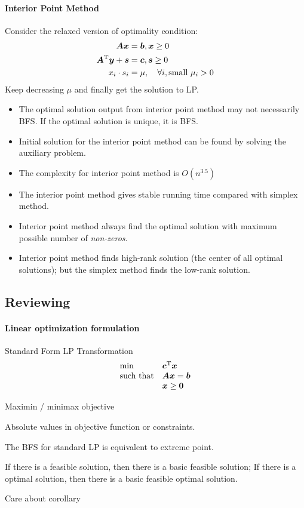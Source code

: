 \paragraph{Interior Point Method}
Consider the relaxed version of optimality condition:
\begin{align*}
\bm{Ax}&=\bm b,\bm x\ge0\\
\bm{A}^{\mathrm T}\bm y+\bm s&=\bm c,\bm s\ge0\\
x_i\cdot s_i&=\mu,\quad\forall i,\mbox{small }\mu_i>0
\end{align*}
Keep decreasing $\mu$ and finally get the solution to LP.
\begin{remark}
\begin{itemize}
\item
The optimal solution output from interior point method may not necessarily BFS. If the optimal solution is unique, it is BFS.
\item
Initial solution for the interior point method can be found by solving the auxiliary problem.
\item
The complexity for interior point method is $O(n^{3.5})$
\item
The interior point method gives stable running time compared with simplex method.
\item
Interior point method always find the optimal solution with maximum possible number of \emph{non-zeros}.
\item
Interior point method finds high-rank solution (the center of all optimal solutions); but the simplex method finds the low-rank solution.
\end{itemize}
\end{remark}

\subsection{Reviewing}
\paragraph{Linear optimization formulation}
Standard Form LP Transformation
\[
\begin{array}{ll}
\min&\bm c^{\mathrm T}\bm x\\
\mbox{such that}&\bm{Ax}=\bm b\\
&\bm x\ge\bm0
\end{array}
\]

Maximin / minimax objective

Absolute values in objective function or constraints.
\begin{theorem}
The BFS for standard LP is equivalent to extreme point.
\end{theorem}
\begin{theorem}
If there is a feasible solution, then there is a basic feasible solution; If there is a optimal solution, then there is a basic feasible optimal solution.
\end{theorem}
Care about corollary

